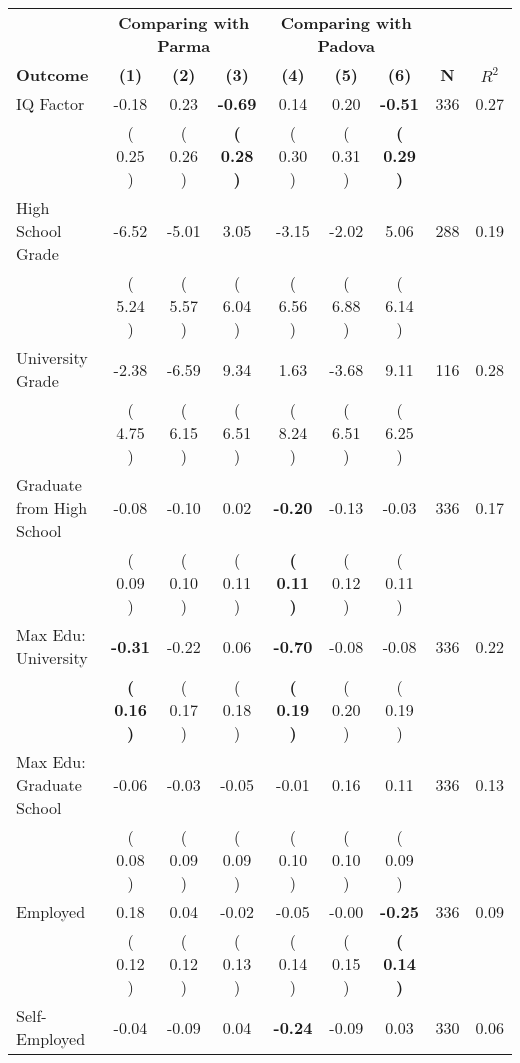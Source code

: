 \begin{tabular}{lcccccccc}
\toprule
 & \multicolumn{3}{c}{\textbf{Comparing with Parma}} & \multicolumn{3}{c}{\textbf{Comparing with Padova}} & \\
\cmidrule(lr){2-4} \cmidrule(lr){5-7} 
 \textbf{Outcome} & \textbf{(1)} & \textbf{(2)} & \textbf{(3)} & \textbf{(4)} & \textbf{(5)} & \textbf{(6)} & \textbf{N} & \textbf{$ R^2$} \\
\midrule
IQ Factor &     -0.18 &      0.23 & \textbf{    -0.69} &      0.14 &      0.20 & \textbf{    -0.51} & 336 &       0.27 \\ 
 & (     0.25 ) & (     0.26 ) & \textbf{(     0.28 )} & (     0.30 ) & (     0.31 ) & \textbf{(     0.29 )} & \\
High School Grade &     -6.52 &     -5.01 &      3.05 &     -3.15 &     -2.02 &      5.06 & 288 &       0.19 \\ 
 & (     5.24 ) & (     5.57 ) & (     6.04 ) & (     6.56 ) & (     6.88 ) & (     6.14 ) & \\
University Grade &     -2.38 &     -6.59 &      9.34 &      1.63 &     -3.68 &      9.11 & 116 &       0.28 \\ 
 & (     4.75 ) & (     6.15 ) & (     6.51 ) & (     8.24 ) & (     6.51 ) & (     6.25 ) & \\
Graduate from High School &     -0.08 &     -0.10 &      0.02 & \textbf{    -0.20} &     -0.13 &     -0.03 & 336 &       0.17 \\ 
 & (     0.09 ) & (     0.10 ) & (     0.11 ) & \textbf{(     0.11 )} & (     0.12 ) & (     0.11 ) & \\
Max Edu: University & \textbf{    -0.31} &     -0.22 &      0.06 & \textbf{    -0.70} &     -0.08 &     -0.08 & 336 &       0.22 \\ 
 & \textbf{(     0.16 )} & (     0.17 ) & (     0.18 ) & \textbf{(     0.19 )} & (     0.20 ) & (     0.19 ) & \\
Max Edu: Graduate School &     -0.06 &     -0.03 &     -0.05 &     -0.01 &      0.16 &      0.11 & 336 &       0.13 \\ 
 & (     0.08 ) & (     0.09 ) & (     0.09 ) & (     0.10 ) & (     0.10 ) & (     0.09 ) & \\
Employed &      0.18 &      0.04 &     -0.02 &     -0.05 &     -0.00 & \textbf{    -0.25} & 336 &       0.09 \\ 
 & (     0.12 ) & (     0.12 ) & (     0.13 ) & (     0.14 ) & (     0.15 ) & \textbf{(     0.14 )} & \\
Self-Employed &     -0.04 &     -0.09 &      0.04 & \textbf{    -0.24} &     -0.09 &      0.03 & 330 &       0.06 \\ 

\end{tabular}

